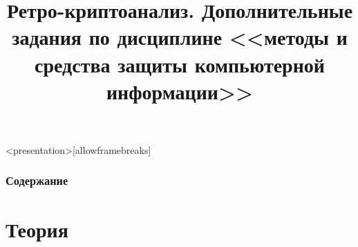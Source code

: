 

\title[Ретро-криптоанализ]{Ретро-криптоанализ. Дополнительные задания по дисциплине <<методы и средства защиты компьютерной информации>>}





\begin{frame}<presentation>[allowframebreaks]
    \frametitle{Содержание}
    \tableofcontents
\end{frame}

\begin{frame}
    \begin{figure}
        \begin{center}
        \end{center}
    \end{figure} 
\end{frame}


\section{Теория}


